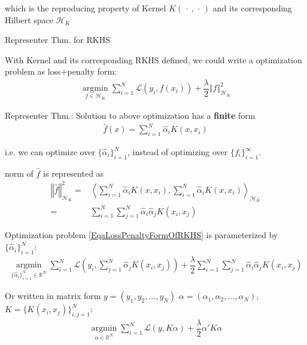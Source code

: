         which is the reproducing property of Kernel $ K(\,\cdot\,,\,\cdot\,) $ and its corresponding Hilbert space $ \mathcal{H}_K $
    
\begin{point}
    Representer Thm. for RKHS
\end{point}

    With Kernel and its corresponding RKHS defined, we could write a optimization problem as loss+penalty form:
    \begin{align}\label{EqaLossPenaltyFormOfRKHS}
         \mathop{\arg\min}\limits_{f\in\mathcal{H}_K}\sum_{i=1}^N\mathcal{L}(y_i, f(x_i)) + \dfrac{\lambda }{2}\left\Vert f \right\Vert^2 _{\mathcal{H}_K}
    \end{align}

    Representer Thm.: Solution to above optimization has a \textbf{finite}  form
    \begin{align}
        \hat{f}(x)=\sum_{i=1}^N\hat{\alpha }_iK(x,x_i) 
    \end{align}

    i.e. we can optimize over $ \{\hat{\alpha }_i\}_{i=1}^N $, instead of optimizing over $ \{f_i\}_{i=1}^{\infty} $.

    norm of $ \hat{f} $ is represented as 
    \begin{align}
        \left\Vert \hat{f} \right\Vert ^2 _{\mathcal{H}_K}=&\left\langle \sum_{i=1}^N\hat{\alpha }_iK(x,x_i),\sum_{i=1}^N\hat{\alpha }_iK(x,x_i) \right\rangle _{\mathcal{H}_K}\\
        =&\sum_{i=1}^N\sum_{j=1}^N\hat{\alpha }_i\hat{\alpha }_j K(x_i,x_j)
    \end{align}

    Optimization problem \autoref{EqaLossPenaltyFormOfRKHS} is parameterized by $ \{\hat{\alpha }_i\}_{i=1}^N $:
    \begin{align}\label{EqaLossPenaltyFormOfKernel}
        \mathop{\arg\min}\limits_{\{\hat{\alpha }_i\}_{i=1}^N\in \mathbb{R}^N}\sum_{i=1}^N\mathcal{L}(y_i, \sum_{j=1}^N\hat{\alpha }_jK(x_i,x_j)) + \dfrac{\lambda }{2}\sum_{i=1}^N\sum_{j=1}^N\hat{\alpha }_i\hat{\alpha }_j K(x_i,x_j)
    \end{align}

    Or written in matrix form $ y=(y_1,y_2,\ldots,y_N) $ $ \alpha =(\alpha _{1},\alpha _{2},\ldots,\alpha _{N})  $, $ K=\{K(x_i,x_j)\}_{i,j=1}^N $:
    \begin{align}
        \mathop{\arg\min}\limits_{\alpha \in \mathbb{R}^N}\sum_{i=1}^N\mathcal{L}(y, K\alpha ) + \dfrac{\lambda }{2}\alpha 'K\alpha 
    \end{align}

